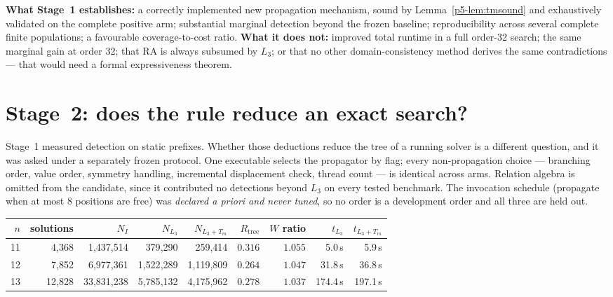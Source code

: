 \documentclass[11pt,a4paper,oneside]{report}
\theoremstyle{definition}
\begin{document}
\noindent\textbf{What Stage~1 establishes:} a correctly implemented new propagation
mechanism, sound by Lemma~\ref{p5-lem:tmsound} and exhaustively validated on the
complete positive arm; substantial marginal detection beyond the frozen baseline;
reproducibility across several complete finite populations; a favourable
coverage-to-cost ratio. \textbf{What it does not:} improved total runtime in a
full order-32 search; the same marginal gain at order 32; that RA is always
subsumed by $L_3$; or that no other domain-consistency method derives the same
contradictions --- that would need a formal expressiveness theorem.



\section{Stage~2: does the rule reduce an exact search?}
\label{p5-sec:f3prime}

Stage~1 measured detection on static prefixes. Whether those deductions reduce the
tree of a running solver is a different question, and it was asked under a
separately frozen protocol. One executable selects the propagator by flag; every
non-propagation choice --- branching order, value order, symmetry handling,
incremental displacement check, thread count --- is identical across arms.
Relation algebra is omitted from the candidate, since it contributed no
detections beyond $L_3$ on every tested benchmark. The invocation schedule
(propagate when at most 8 positions are free) was \emph{declared a priori and
never tuned}, so no order is a development order and all three are held out.

\begin{center}
\begin{tabular}{@{}rrrrrrrrr@{}}
\toprule
$n$ & solutions & $N_I$ & $N_{L_3}$ & $N_{L_3+T_m}$ & $R_{\text{tree}}$ & $W$ ratio & $t_{L_3}$ & $t_{L_3+T_m}$ \\
\midrule
11 & 4{,}368 & 1{,}437{,}514 & 379{,}290 & 259{,}414 & $0.316$ & $1.055$ & 5.0\,s & 5.9\,s \\
12 & 7{,}852 & 6{,}977{,}361 & 1{,}522{,}289 & 1{,}119{,}809 & $0.264$ & $1.047$ & 31.8\,s & 36.8\,s \\
13 & 12{,}828 & 33{,}831{,}238 & 5{,}785{,}132 & 4{,}175{,}962 & $0.278$ & $1.037$ & 174.4\,s & 197.1\,s \\
\bottomrule
\end{tabular}
\end{center}
\end{document}
